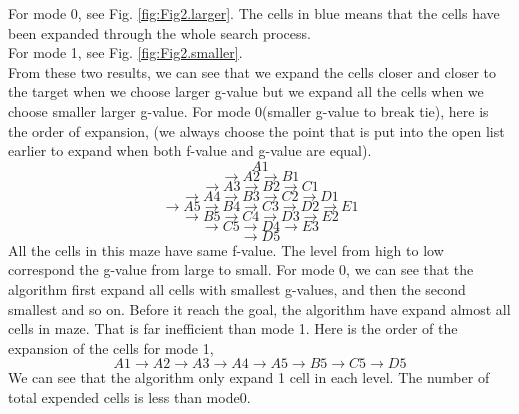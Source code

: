 \documentclass[11pt]{article}
\begin{document}
\newline 
For mode 0, see Fig. \ref{fig:Fig2.larger}.
The cells in blue means that the cells have been expanded through the whole search process.\\ 
For mode 1, see Fig. \ref{fig:Fig2.smaller}.\\
From these two results, we can see that we expand the cells closer and closer to the target when we choose larger g-value but we expand all the cells when we choose smaller larger g-value. 
\newline 
For mode 0(smaller g-value to break tie), here is the order of expansion,
\newline(we always choose the point that is put into the open list earlier to expand when both f-value and g-value are equal).
$$A1$$
$$\to A2\to B1$$
$$\to A3\to B2\to C1$$
$$\to A4\to B3\to C2\to D1$$
$$\to A5\to B4\to C3\to D2\to E1$$
$$\to B5\to C4\to D3\to E2$$
$$\to C5\to D4\to E3$$
$$\to D5$$
All the cells in this maze have same f-value. The level from high to low correspond the g-value from large to small.
\newline
For mode 0, we can see that the algorithm first expand all cells with smallest g-values, and then the second smallest and so on. Before it reach the goal, the algorithm have expand almost all cells in maze. That is far inefficient than mode 1. 
Here is the order of the expansion of the cells for mode 1,
$$A1\to A2\to A3\to A4\to A5\to B5\to C5\to D5$$
We can see that the algorithm only expand 1 cell in each level. The number of total expended cells is less than mode0.

\end{document}
